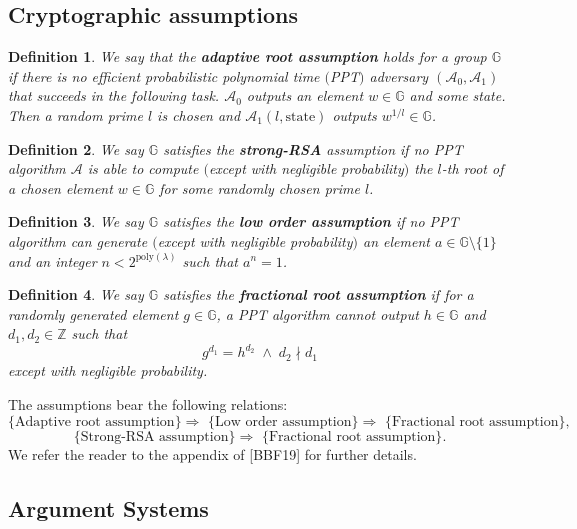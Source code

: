 \documentclass[11pt, lettersize, notitlepage, leqno, footskip=0.6cm]{article}
\newcommand{\bz}{\mathbb Z}
\newcommand{\imp}{\Longrightarrow}
\newcommand{\mc}{\mathcal}
\newcommand{\mb}{\mathbb}
\newcommand{\mr}{\mathrm}
\newcommand{\lam}{\lambda}
\newcommand{\vs}{\vspace{-0.15cm}}
\newcommand{\noin}{\noindent}
\newtheorem{Def}{Definition}[section]
\numberwithin{equation}{section}
\begin{document}
\subsection{\fontsize{11}{11} Cryptographic assumptions}

\begin{Def} We say that the \textbf{adaptive root assumption} holds for a group $\mb{G}$ if there is no efficient probabilistic polynomial time $($PPT$)$ adversary $(\mc{A}_0, \mc{A}_1)$ that succeeds in the following task. $\mc{A}_0$ outputs an element $w\in \mb{G}$ and some state. Then a random prime $l$ is chosen and $\mc{A}_1(l, \mr{state})$ outputs $w^{1/l}\in \mb{G}$. \end{Def}
 

\begin{Def} We say $\mb{G}$ satisfies the \textbf{strong-RSA} assumption if no PPT algorithm $\mc{A}$ is able to compute $($except with negligible probability$)$ the $l$-th root of a chosen element $w\in \mb{G}$ for some randomly chosen prime $l$.\end{Def}

\begin{Def} We say $\mb{G}$ satisfies the \textbf{low order assumption} if no PPT algorithm can generate $($except with negligible probability$)$ an element $a\in\mb{G}\setminus\{1\}$ and an integer $n< 2^{\mr{poly}(\lam)}$ such that $a^n = 1$.\end{Def}

\begin{Def} We say $\mb{G}$ satisfies the \textbf{fractional root assumption} if for a randomly generated element $g\in \mb{G}$, a PPT algorithm cannot output $h\in\mb{G}$ and $d_1,d_2\in\bz$ such that \vs $$g^{d_1} = h^{d_2}\;\wedge\; d_2 \nmid d_1$$ except with negligible probability.\end{Def}

\noin The assumptions bear the following relations: \vs $$\text{\{Adaptive root assumption\} }\imp \text{ \{Low order assumption\} } \imp \text{ \{Fractional root assumption\} },$$ \vspace{-0.6cm} $$\text{\{Strong-RSA assumption\} }\imp \text{ \{Fractional root assumption\}}. $$ We refer the reader to the appendix of [BBF19] for further details.

\subsection{\fontsize{11}{11}\selectfont Argument Systems }
\end{document}
